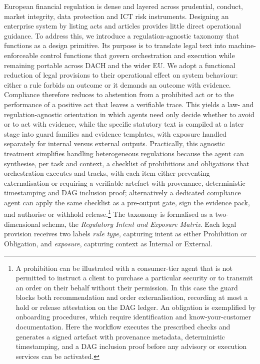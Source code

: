 \documentclass[oneside,10pt]{swissi}
\begin{document}
European financial regulation is dense and layered across prudential, conduct, market integrity, data protection and ICT risk instruments. Designing an enterprise system by listing acts and articles provides little direct operational guidance. To address this, we introduce a regulation-agnostic taxonomy that functions as a design primitive. Its purpose is to translate legal text into machine-enforceable control functions that govern orchestration and execution while remaining portable across DACH and the wider EU. We adopt a functional reduction of legal provisions to their operational effect on system behaviour: either a rule forbids an outcome or it demands an outcome with evidence. Compliance therefore reduces to abstention from a prohibited act or to the performance of a positive act that leaves a verifiable trace. This yields a law- and regulation-agnostic orientation in which agents need only decide whether to avoid or to act with evidence, while the specific statutory text is compiled at a later stage into guard families and evidence templates, with exposure handled separately for internal versus external outputs. Practically, this agnostic treatment simplifies handling heterogeneous regulations because the agent can synthesise, per task and context, a checklist of prohibitions and obligations that orchestration executes and tracks, with each item either preventing externalisation or requiring a verifiable artefact with provenance, deterministic timestamping and DAG inclusion proof; alternatively a dedicated compliance agent can apply the same checklist as a pre-output gate, sign the evidence pack, and authorise or withhold release.\footnote{A prohibition can be illustrated with a consumer-tier agent that is not permitted to instruct a client to purchase a particular security or to transmit an order on their behalf without their permission. In this case the guard blocks both recommendation and order externalisation, recording at most a hold or release attestation on the DAG ledger. An obligation is exemplified by onboarding procedures, which require identification and know-your-customer documentation. Here the workflow executes the prescribed checks and generates a signed artefact with provenance metadata, deterministic timestamping, and a DAG inclusion proof before any advisory or execution services can be activated.} The taxonomy is formalised as a two-dimensional schema, the \emph{Regulatory Intent and Exposure Matrix}. Each legal provision receives two labels \emph{rule type}, capturing intent as either Prohibition or Obligation, and \emph{exposure}, capturing context as Internal or External.
\end{document}
